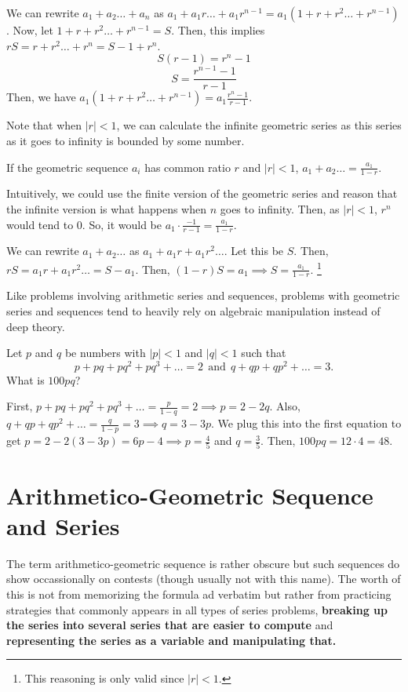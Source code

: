 \documentclass[11pt]{article}
\begin{document}
\begin{pro}
We can rewrite $a_{1}+a_{2}\ldots + a_{n}$ as $a_{1}+a_{1}r\ldots + a_{1}r^{n-1}=a_{1}(1+r+r^2\ldots + r^{n-1})$. Now, let $1+r+r^2\ldots + r^{n-1}=S$. Then, this implies $rS=r+r^2\ldots + r^{n}=S-1+r^{n}$.
$$S(r-1)=r^{n}-1$$
$$S=\frac{r^{n-1}-1}{r-1}$$
Then, we have $a_{1}(1+r+r^2\ldots + r^{n-1})=a_{1}\frac{r^{n}-1}{r-1}$.
\end{pro}

Note that when $|r|<1$, we can calculate the infinite geometric series as this series as it goes to infinity is bounded by some number.
\begin{theo}
If the geometric sequence $a_{i}$ has common ratio $r$ and $|r|<1$, $a_{1}+a_{2}\ldots = \frac{a_{1}}{1-r}$.
\end{theo}

Intuitively, we could use the finite version of the geometric series and reason that the infinite version is what happens when $n$ goes to infinity. Then, as $|r|<1$, $r^{n}$ would tend to $0$. So, it would be $a_{1}\cdot \frac{-1}{r-1}=\frac{a_{1}}{1-r}$.

\begin{pro}
We can rewrite $a_{1}+a_{2}\ldots $ as $a_{1}+a_{1}r+a_{1}r^2\ldots$. Let this be $S$. Then, $rS=a_{1}r+a_{1}r^2\ldots = S-a_{1}$. Then, $(1-r)S=a_{1}\implies S =\frac{a_{1}}{1-r}$. \footnote{This reasoning is only valid since $|r|<1$.}
\end{pro}

Like problems involving arithmetic series and sequences, problems with geometric series and sequences tend to heavily rely on algebraic manipulation instead of deep theory.
\begin{exam}
Let $p$ and $q$ be numbers with  $|p| <1$ and $|q| <1$ such that \[p+pq+pq^2+pq^3 + \dots = 2  ~~\text{and} ~~ q + qp + qp^2 + \dots = 3.\] What is $100pq$?
\end{exam}

\begin{sol}
First, $p+pq+pq^2+pq^3 + \dots = \frac{p}{1-q}=2\implies p=2-2q$. Also, $q+qp+qp^2 + \dots = \frac{q}{1-p}=3\implies q=3-3p$. We plug this into the first equation to get $p=2-2(3-3p)=6p-4\implies p = \frac{4}{5}$ and $q=\frac{3}{5}$. Then, $100pq=12\cdot 4=\boxed{48}$.
\end{sol}

\section{Arithmetico-Geometric Sequence and Series}
The term arithmetico-geometric sequence is rather obscure but such sequences do show occassionally on contests (though usually not with this name). The worth of this is not from memorizing the formula ad verbatim but rather from practicing strategies that commonly appears in all types of series problems, \textbf{breaking up the series into several series that are easier to compute} and \textbf{representing the series as a variable and manipulating that.}
\end{document}
